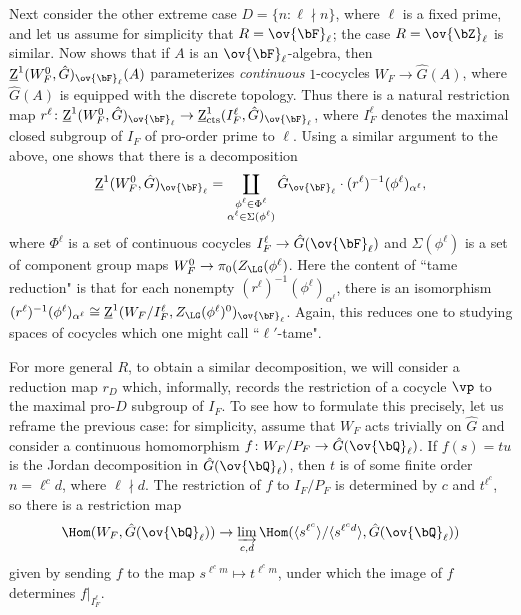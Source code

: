 Next consider the other extreme case $D = \{n\colon \ell \nmid n\}$, where $\ell$ is a fixed prime, and let us assume for simplicity that $R = \ov{\bF}_{\ell}$; the case $R = \ov{\bZ}_{\ell}$ is similar. Now \cite[4.1]{DHKM} shows that if $A$ is an $\ov{\bF}_\ell$-algebra, then $\underline{\rm{Z}}^1(W_F^0, \hat{G})_{\ov{\bF}_{\ell}}(A)$ parameterizes \textit{continuous} $1$-cocycles $W_F \to \hat{G}(A)$, where $\hat{G}(A)$ is equipped with the discrete topology. Thus there is a natural restriction map $r^{\ell}\colon \underline{\rm{Z}}^1(W_F^0, \hat{G})_{\ov{\bF}_{\ell}} \to \underline{\rm{Z}}^1_{\rm{cts}}(I_F^{\ell}, \hat{G})_{\ov{\bF}_{\ell}}$, where $I_F^{\ell}$ denotes the maximal closed subgroup of $I_F$ of pro-order prime to $\ell$. Using a similar argument to the above, one shows that there is a decomposition
\[
\underline{\rm{Z}}^1(W_F^0, \hat{G})_{\ov{\bF}_{\ell}} = \coprod_{\substack{\phi^\ell \in \Phi^\ell \\ \alpha^\ell \in \Sigma(\phi^\ell)}} \hat{G}_{\ov{\bF}_\ell} \cdot (r^\ell)^{-1}(\phi^\ell)_{\alpha^\ell},
\]
where $\Phi^\ell$ is a set of continuous cocycles $I_F^\ell \to \hat{G}(\ov{\bF}_\ell)$ and $\Sigma(\phi^{\ell})$ is a set of component group maps $W_F^0 \to \pi_0(Z_{\LG}(\phi^{\ell})$. Here the content of ``tame reduction" is that for each nonempty $(r^\ell)^{-1}(\phi^\ell)_{\alpha^\ell}$, there is an isomorphism $(r^\ell)^{-1}(\phi^\ell)_{\alpha^\ell} \cong \underline{\rm{Z}}^1(W_F/I_F^\ell, Z_{\LG}(\phi^\ell)^0)_{\ov{\bF}_{\ell}}$. Again, this reduces one to studying spaces of cocycles which one might call ``$\ell'$-tame". \smallskip

For more general $R$, to obtain a similar decomposition, we will consider a reduction map $r_D$ which, informally, records the restriction of a cocycle $\vp$ to the maximal pro-$D$ subgroup of $I_F$. To see how to formulate this precisely, let us reframe the previous case: for simplicity, assume that $W_F$ acts trivially on $\hat{G}$ and consider a continuous homomorphism $f\colon W_F/P_F \to \hat{G}(\ov{\bQ}_\ell)$. If $f(s) = tu$ is the Jordan decomposition in $\hat{G}(\ov{\bQ}_\ell)$, then $t$ is of some finite order $n = \ell^c d$, where $\ell \nmid d$. The restriction of $f$ to $I_F/P_F$ is determined by $c$ and $t^{\ell^c}$, so there is a restriction map
\[
\Hom(W_F, \hat{G}(\ov{\bQ}_\ell)) \to \varinjlim_{c, d} \Hom(\langle s^{\ell^c} \rangle/\langle s^{\ell^c d} \rangle, \hat{G}(\ov{\bQ}_\ell))
\]
given by sending $f$ to the map $s^{\ell^c m} \mapsto t^{\ell^c m}$, under which the image of $f$ determines $f|_{I_F^{\ell}}$.\smallskip

